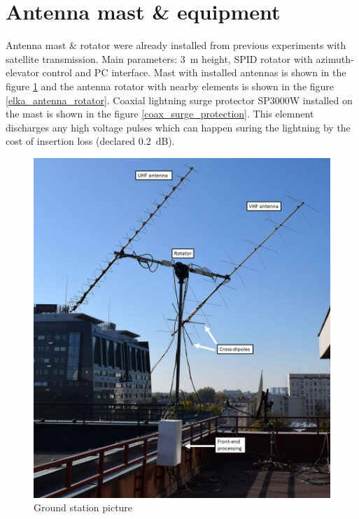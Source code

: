 \section{Antenna mast \& equipment}
Antenna mast \& rotator were already installed from previous experiments with satellite transmission. Main parameters: \SI{3}{\meter} height, SPID rotator with azimuth-elevator control and PC interface. Mast with installed antennas is shown in the figure \ref{elka_antena_mast} and the antenna rotator with nearby elements is shown in the figure \ref{elka_antenna_rotator}. Coaxial lightning surge protector SP3000W installed on the mast is shown in the figure \ref{coax_surge_protection}. This elemnent discharges any high voltage pulses which can happen suring the lightning by the cost of insertion loss (declared \SI{0.2}{\dB}).

\begin{figure}[H]
    \centering
    \includegraphics[width=0.45\paperwidth]{img/7/elka_antena_mast.jpg}
    \caption{Ground station picture}
    \label{elka_antena_mast}
\end{figure}

